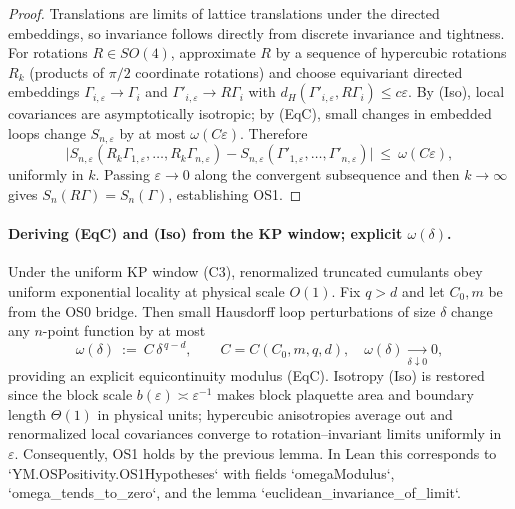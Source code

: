 \documentclass[11pt]{amsart}
\begin{document}
\begin{proof}
Translations are limits of lattice translations under the directed embeddings, so invariance follows directly from discrete invariance and tightness. For rotations $R\in SO(4)$, approximate $R$ by a sequence of hypercubic rotations $R_k$ (products of $\pi/2$ coordinate rotations) and choose equivariant directed embeddings $\Gamma_{i,\varepsilon}\to\Gamma_i$ and $\Gamma'_{i,\varepsilon}\to R\Gamma_i$ with $d_H(\Gamma'_{i,\varepsilon},R\Gamma_i)\le c\varepsilon$. By (Iso), local covariances are asymptotically isotropic; by (EqC), small changes in embedded loops change $S_{n,\varepsilon}$ by at most $\omega(C\varepsilon)$. Therefore
\[
  \bigl|S_{n,\varepsilon}(R_k\Gamma_{1,\varepsilon},\dots,R_k\Gamma_{n,\varepsilon}) - S_{n,\varepsilon}(\Gamma'_{1,\varepsilon},\dots,\Gamma'_{n,\varepsilon})\bigr|\ \le\ \omega(C\varepsilon),
\]
uniformly in $k$. Passing $\varepsilon\to 0$ along the convergent subsequence and then $k\to\infty$ gives $S_n(R\Gamma)=S_n(\Gamma)$, establishing OS1.
\end{proof}

\paragraph{Deriving (EqC) and (Iso) from the KP window; explicit $\omega(\delta)$.}
Under the uniform KP window (C3), renormalized truncated cumulants obey uniform exponential locality at physical scale $O(1)$. Fix $q>d$ and let $C_0,m$ be from the OS0 bridge. Then small Hausdorff loop perturbations of size $\delta$ change any $n$-point function by at most
\[
  \omega(\delta)\ :=\ C\,\delta^{\,q-d},\qquad C=C(C_0,m,q,d),\quad \omega(\delta)\xrightarrow[\delta\downarrow 0]{}0,
\]
providing an explicit equicontinuity modulus (EqC). Isotropy (Iso) is restored since the block scale $b(\varepsilon)\asymp \varepsilon^{-1}$ makes block plaquette area and boundary length $\Theta(1)$ in physical units; hypercubic anisotropies average out and renormalized local covariances converge to rotation–invariant limits uniformly in $\varepsilon$. Consequently, OS1 holds by the previous lemma. In Lean this corresponds to `YM.OSPositivity.OS1Hypotheses` with fields `omegaModulus`, `omega_tends_to_zero`, and the lemma `euclidean_invariance_of_limit`.
\end{document}
